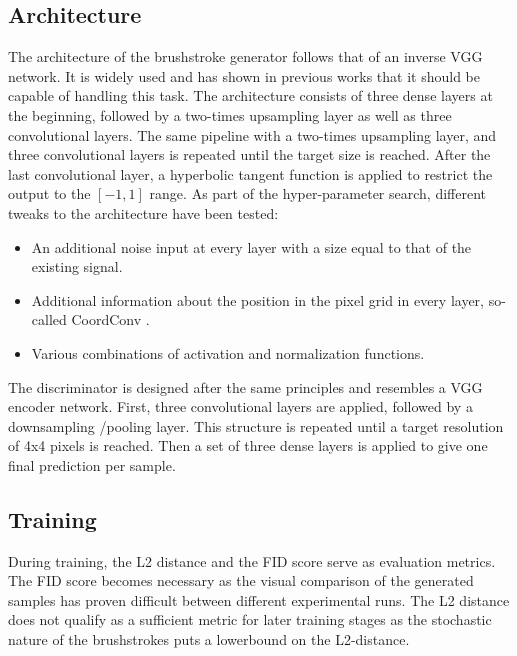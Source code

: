 \subsection{Architecture}
The architecture of the brushstroke generator follows that of an inverse VGG network.
It is widely used and has shown in previous works that it should be capable of handling this task.
 The architecture consists of three dense layers at the beginning, followed by a two-times upsampling layer as well as three convolutional layers.
The same pipeline with a two-times upsampling layer, and three convolutional layers is repeated until the target size is reached.
After the last convolutional layer, a hyperbolic tangent function is applied to restrict the output to the $[-1, 1]$ range.
As part of the hyper-parameter search, different tweaks to the architecture have been tested:
\begin{itemize}
    \item An additional noise input at every layer with a size equal to that of the existing signal.
    \item Additional information about the position in the pixel grid in every layer, so-called CoordConv \cite{coordconv}.
    \item Various combinations of activation and normalization functions.
\end{itemize}

%        
%        

The discriminator is designed after the same principles and resembles a VGG encoder network.
First, three convolutional layers are applied, followed by a downsampling /pooling layer.
This structure is repeated until a target resolution of 4x4 pixels is reached.
Then a set of three dense layers is applied to give one final prediction per sample.

\subsection{Training}
During training, the L2 distance and the FID score serve as evaluation metrics.
The FID score becomes necessary as the visual comparison of the generated samples has proven difficult between different experimental runs.
The L2 distance does not qualify as a sufficient metric for later training stages as the stochastic nature of the brushstrokes puts a lowerbound on the L2-distance.

